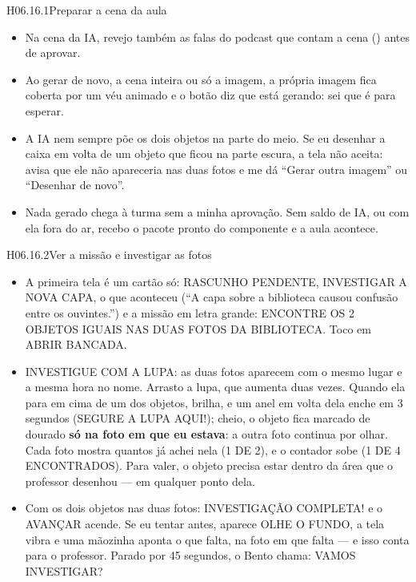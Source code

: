 \begin{historia}{H06.16.1}{Preparar a cena da aula}{\pronto}
\begin{itemize}
    ele vale só neste navegador e nesta sessão.
  \item Na cena da IA, revejo também as falas do podcast que contam a cena
    () antes de aprovar.
  \item Ao gerar de novo, a cena inteira ou só a imagem, a própria imagem
    fica coberta por um véu animado e o botão diz que está gerando: sei que é
    para esperar.
  \item A IA nem sempre põe os dois objetos na parte do meio. Se eu desenhar a
    caixa em volta de um objeto que ficou na parte escura, a tela não aceita:
    avisa que ele não apareceria nas duas fotos e me dá \enquote{Gerar outra
    imagem} ou \enquote{Desenhar de novo}.
  \item Nada gerado chega à turma sem a minha aprovação. Sem saldo de IA, ou
    com ela fora do ar, recebo o pacote pronto do componente e a aula
    acontece.
\end{itemize}
\end{historia}

\begin{historia}{H06.16.2}{Ver a missão e investigar as fotos}{\pronto}
\aceite
\begin{itemize}
  \item A primeira tela é um cartão só: RASCUNHO PENDENTE, INVESTIGAR A NOVA
    CAPA, o que aconteceu (\enquote{A capa sobre a biblioteca causou confusão
    entre os ouvintes.}) e a missão em letra grande: ENCONTRE OS 2 OBJETOS
    IGUAIS NAS DUAS FOTOS DA BIBLIOTECA. Toco em ABRIR BANCADA.
  \item INVESTIGUE COM A LUPA: as duas fotos aparecem com o mesmo lugar e a
    mesma hora no nome. Arrasto a lupa, que aumenta duas vezes. Quando ela
    para em cima de um dos objetos, brilha, e um anel em volta dela enche em
    3 segundos (SEGURE A LUPA AQUI!); cheio, o objeto fica marcado de dourado
    \textbf{só na foto em que eu estava}: a outra foto continua por olhar. Cada
    foto mostra quantos já achei nela (1 DE 2), e o contador sobe (1 DE 4
    ENCONTRADOS). Para valer, o objeto precisa estar dentro da área que o
    professor desenhou --- em qualquer ponto dela.
  \item Com os dois objetos nas duas fotos: INVESTIGAÇÃO COMPLETA! e o
    AVANÇAR acende. Se eu tentar antes, aparece OLHE O FUNDO, a tela vibra e
    uma mãozinha aponta o que falta, na foto em que falta --- e isso conta para o professor. Parado por 45 segundos, o Bento
    chama: VAMOS INVESTIGAR?
\end{itemize}
\end{historia}

